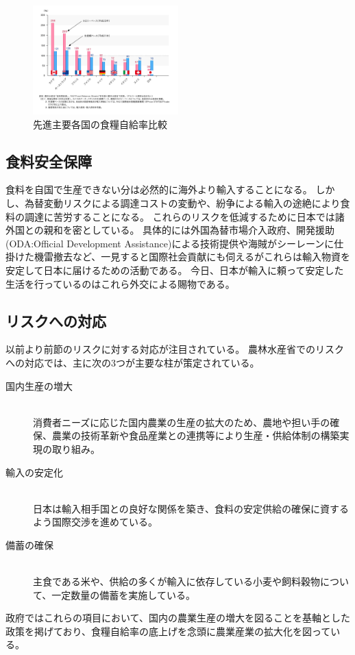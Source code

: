 \begin{figure}[b] 
    \centering
    \includegraphics[width=0.5\textwidth]{image/intro/g7hikaku.jpg}
    \caption{先進主要各国の食糧自給率比較} 
    \label{g7hikaku}
\end{figure}
\subsection{食料安全保障}
食料を自国で生産できない分は必然的に海外より輸入することになる。
しかし、為替変動リスクによる調達コストの変動や、紛争による輸入の途絶により食料の調達に苦労することになる。
これらのリスクを低減するために日本では諸外国との親和を密としている。
具体的には外国為替市場介入政府\cite{boj}、開発援助 (ODA:Official Development Assistance)による技術提供や海賊がシーレーンに仕掛けた機雷撤去\cite{oda}など、一見すると国際社会貢献にも伺えるがこれらは輸入物資を安定して日本に届けるための活動である。
今日、日本が輸入に頼って安定した生活を行っているのはこれら外交による賜物である。
\subsection{リスクへの対応}
以前より前節のリスクに対する対応が注目されている。
農林水産省でのリスクへの対応では、主に次の3つが主要な柱が策定されている。\cite{FoodSafety}
\begin{description}
    \item[国内生産の増大]\mybox{}\\
        消費者ニーズに応じた国内農業の生産の拡大のため、農地や担い手の確保、農業の技術革新や食品産業との連携等により生産・供給体制の構築実現の取り組み。
    \item[輸入の安定化] \mybox{}\\
        日本は輸入相手国との良好な関係を築き、食料の安定供給の確保に資するよう国際交渉を進めている。
    \item[備蓄の確保] \mybox{}\\
        主食である米や、供給の多くが輸入に依存している小麦や飼料穀物について、一定数量の備蓄を実施している。
\end{description}
政府ではこれらの項目において、国内の農業生産の増大を図ることを基軸とした政策を掲げており、食糧自給率の底上げを念頭に農業産業の拡大化を図っている。

